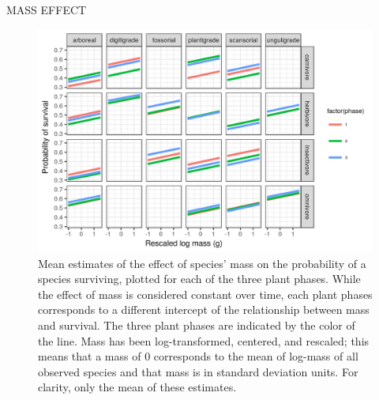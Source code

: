 \documentclass[12pt,letterpaper]{article}
\begin{document}
\uppercase{mass effect}
\begin{figure}[ht]
  \centering
  \includegraphics[width=\textwidth,height=0.4\textheight,keepaspectratio=true]{figure/mass_on_surv_bd}
  \caption{Mean estimates of the effect of species' mass on the probability of a species surviving, plotted for each of the three plant phases. While the effect of mass is considered constant over time, each plant phases corresponds to a different intercept of the relationship between mass and survival. The three plant phases are indicated by the color of the line. Mass has been log-transformed, centered, and rescaled; this means that a mass of 0 corresponds to the mean of log-mass of all observed species and that mass is in standard deviation units. For clarity, only the mean of these estimates.}
  \label{fig:mass_survival}
\end{figure}
\end{document}
